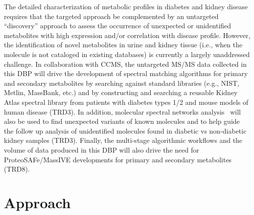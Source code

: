 \documentclass[arial,11pt]{article}
\begin{document}
The detailed characterization of metabolic profiles in diabetes and kidney disease requires that the targeted approach be complemented by an untargeted ``discovery'' approach to assess the occurrence of unexpected or unidentified metabolites with high expression and/or correlation with disease profile. However, the identification of novel metabolites in urine and kidney tissue (i.e., when the molecule is not cataloged in existing databases) is currently a largely unaddressed challenge. In collaboration with CCMS, the untargeted MS/MS data collected in this DBP will drive the development of spectral matching algorithms for primary and secondary metabolites by searching against standard libraries (e.g., NIST, Metlin, MassBank, etc.) and by constructing and searching a reusable Kidney Atlas spectral library from patients with diabetes types 1/2 and mouse models of human disease (TRD3). In addition, molecular spectral networks analysis~\cite{watrous12,moree12} will also be used to find unexpected variants of known molecules and to help guide the follow up analysis of unidentified molecules found in diabetic vs non-diabetic kidney samples (TRD3). Finally, the multi-stage algorithmic workflows and the volume of data produced in this DBP will also drive the need for ProteoSAFe/MassIVE developments for primary and secondary metabolites (TRD8).

\section{Approach}

\end{document}
